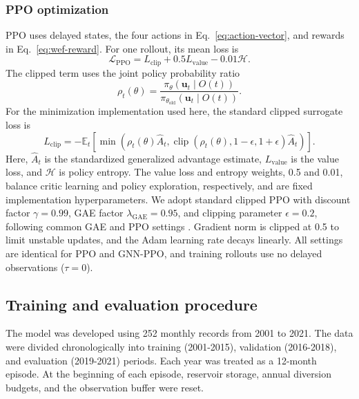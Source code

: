 \documentclass [a4paper,fleqn] {cas-dc}
\begin{document}
\subsubsection{PPO optimization}
\label{sec323}

PPO uses delayed states, the four actions in Eq.~\ref{eq:action-vector}, and rewards in Eq.~\ref{eq:wef-reward}. For one rollout, its mean loss is
\begin{equation}
  \mathcal L_{\mathrm{PPO}}=L_{\mathrm{clip}}
  +0.5L_{\mathrm{value}}-0.01\mathcal H.
  \label{eq:ppo-objective}
\end{equation}
The clipped term uses the joint policy probability ratio
\begin{equation}
  \rho_t(\theta)=
  \frac{\pi_\theta\!\left(\mathbf u_t\mid O(t)\right)}
       {\pi_{\theta_{\mathrm{old}}}\!\left(\mathbf u_t\mid O(t)\right)}.
  \label{eq:ppo-ratio}
\end{equation}
For the minimization implementation used here, the standard clipped surrogate loss is
\begin{equation}
  L_{\mathrm{clip}}=
  -\mathbb E_t\!\left[
  \min\!\left(
  \rho_t(\theta)\hat A_t,
  \operatorname{clip}\!\left(\rho_t(\theta),1-\epsilon,1+\epsilon\right)
  \hat A_t
  \right)\right].
  \label{eq:ppo-clipped-surrogate}
\end{equation}
Here, $\hat A_t$ is the standardized generalized advantage estimate, $L_{\mathrm{value}}$ is the value loss, and $\mathcal H$ is policy entropy. The value loss and entropy weights, 0.5 and 0.01, balance critic learning and policy exploration, respectively, and are fixed implementation hyperparameters. We adopt standard clipped PPO with discount factor $\gamma=0.99$, GAE factor $\lambda_{\mathrm{GAE}}=0.95$, and clipping parameter $\epsilon=0.2$, following common GAE and PPO settings \citep{schulman2016gae,schulman2017ppo}. Gradient norm is clipped at 0.5 to limit unstable updates, and the Adam learning rate decays linearly. All settings are identical for PPO and GNN-PPO, and training rollouts use no delayed observations ($\tau=0$).

\subsection{Training and evaluation procedure}
\label{sec33}

The model was developed using 252 monthly records from 2001 to 2021. The data were divided chronologically into training (2001-2015), validation (2016-2018), and evaluation (2019-2021) periods. Each year was treated as a 12-month episode. At the beginning of each episode, reservoir storage, annual diversion budgets, and the observation buffer were reset.
\end{document}
